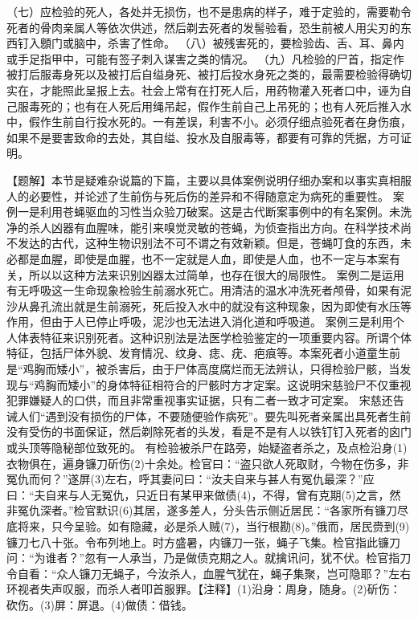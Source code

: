 \documentclass[12pt,UTF8]{ctexbook}
\begin{document}
（七）应检验的死人，各处并无损伤，也不是患病的样子，难于定验的，需要勒令死者的骨肉亲属人等依次供述，然后剃去死者的发髻验看，恐生前被人用尖刃的东西钉入顖门或脑中，杀害了性命。
（八）被残害死的，要检验齿、舌、耳、鼻内或手足指甲中，可能有签子刺入谋害之类的情况。
（九）凡检验的尸首，指定作被打后服毒身死以及被打后自缢身死、被打后投水身死之类的，最需要检验得确切实在，才能照此呈报上去。社会上常有在打死人后，用药物灌入死者口中，诬为自己服毒死的；也有在人死后用绳吊起，假作生前自己上吊死的；也有人死后推入水中，假作生前自行投水死的。一有差误，利害不小。必须仔细点验死者在身伤痕，如果不是要害致命的去处，其自缢、投水及自服毒等，都要有可靠的凭据，方可证明。


【题解】本节是疑难杂说篇的下篇，主要以具体案例说明仔细办案和以事实真相服人的必要性，并论述了生前伤与死后伤的差异和不得随意定为病死的重要性。
案例一是利用苍蝇驱血的习性当众验刀破案。这是古代断案事例中的有名案例。未洗净的杀人凶器有血腥味，能引来嗅觉灵敏的苍蝇，为侦查指出方向。在科学技术尚不发达的古代，这种生物识别法不可不谓之有效新颖。但是，苍蝇叮食的东西，未必都是血腥，即使是血腥，也不一定就是人血，即使是人血，也不一定与本案有关，所以以这种方法来识别凶器太过简单，也存在很大的局限性。
案例二是运用有无呼吸这一生命现象检验生前溺水死亡。用清洁的温水冲洗死者颅骨，如果有泥沙从鼻孔流出就是生前溺死，死后投入水中的就没有这种现象，因为即使有水压等作用，但由于人已停止呼吸，泥沙也无法进入消化道和呼吸道。
案例三是利用个人体表特征来识别死者。这种识别法是法医学检验鉴定的一项重要内容。所谓个体特征，包括尸体外貌、发育情况、纹身、痣、疣、疤痕等。本案死者小道童生前是“鸡胸而矮小”，被杀害后，由于尸体高度腐烂而无法辨认，只得检验尸骸，当发现与“鸡胸而矮小”的身体特征相符合的尸骸时方才定案。这说明宋慈验尸不仅重视犯罪嫌疑人的口供，而且非常重视事实证据，只有二者一致才可定案。
宋慈还告诫人们“遇到没有损伤的尸体，不要随便验作病死”。要先叫死者亲属出具死者生前没有受伤的书面保证，然后剃除死者的头发，看是不是有人以铁钉钉入死者的囟门或头顶等隐秘部位致死的。
有检验被杀尸在路旁，始疑盗者杀之，及点检沿身(1)衣物俱在，遍身镰刀斫伤(2)十余处。检官曰：“盗只欲人死取财，今物在伤多，非冤仇而何？”遂屏(3)左右，呼其妻问曰：“汝夫自来与甚人有冤仇最深？”应曰：“夫自来与人无冤仇，只近日有某甲来做债(4)，不得，曾有克期(5)之言，然非冤仇深者。”检官默识(6)其居，遂多差人，分头告示侧近居民：“各家所有镰刀尽底将来，只今呈验。如有隐藏，必是杀人贼(7)，当行根勘(8)。”俄而，居民赍到(9)镰刀七八十张。令布列地上。时方盛暑，内镰刀一张，蝇子飞集。检官指此镰刀问：“为谁者？”忽有一人承当，乃是做债克期之人。就擒讯问，犹不伏。检官指刀令自看：“众人镰刀无蝇子，今汝杀人，血腥气犹在，蝇子集聚，岂可隐耶？”左右环视者失声叹服，而杀人者叩首服罪。【注释】(1)沿身：周身，随身。(2)斫伤：砍伤。(3)屏：屏退。(4)做债：借钱。
\end{document}
